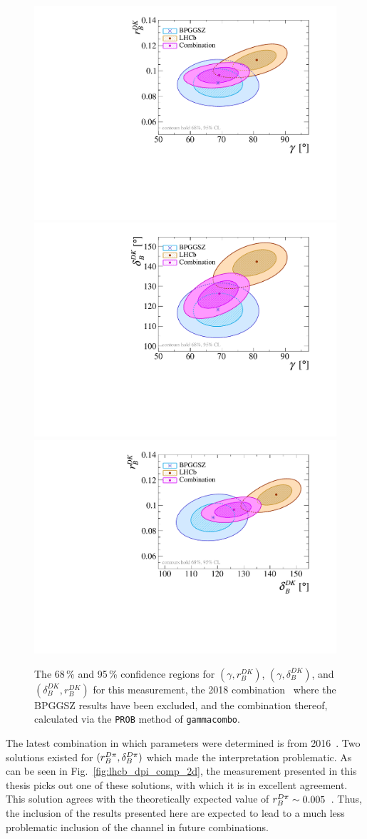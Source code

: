 \begin{figure}[tp]
    \centering
    \includegraphics[width=0.45\columnwidth]{figures/analysis/interpretation/2d_g_r_dk_vs_old_lhcb_prob.pdf}
    \includegraphics[width=0.45\columnwidth]{figures/analysis/interpretation/2d_g_d_dk_vs_old_lhcb_prob.pdf}
    \includegraphics[width=0.45\columnwidth]{figures/analysis/interpretation/2d_d_dk_r_dk_vs_old_lhcb_prob.pdf}
    \caption{The 68\,\% and 95\,\% confidence regions  for $(\gamma, r_B^{DK})$, $(\gamma, \delta_B^{DK})$, and $(\delta_B^{DK}, r_B^{DK})$ for this measurement, the 2018 \lhcb combination~\cite{LHCb-CONF-2018-002} where the BPGGSZ results have been excluded, and the combination thereof, calculated via the \texttt{PROB} method of \texttt{gammacombo}.}
    \label{fig:lhcb_dk_comp_2d}
\end{figure}



The latest \lhcb combination in which \BtoDpi parameters were determined is from 2016~\cite{LHCb-PAPER-2016-032}. Two solutions existed for $(r_B^{{D}\pi}, \delta_B^{{D}\pi})$ which made the interpretation problematic. As can be seen in Fig.~\ref{fig:lhcb_dpi_comp_2d}, the measurement presented in this thesis picks out one of these solutions, with which it is in excellent agreement. This solution agrees with the theoretically expected value of $r_B^{{D}\pi}\sim 0.005$~\cite{rDpi}. Thus, the inclusion of the results presented here are expected to lead to a much less problematic inclusion of the \BtoDpi channel in future \lhcb combinations.

